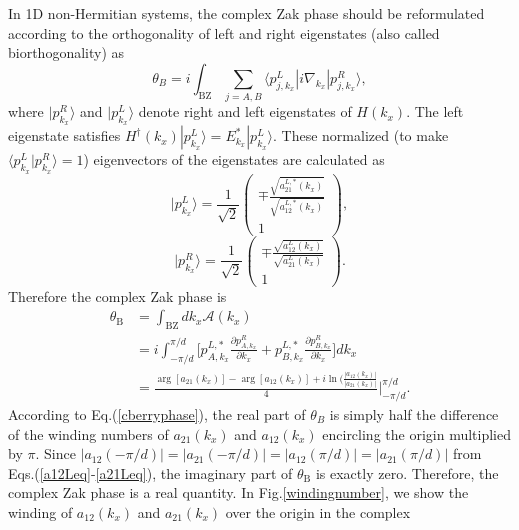 \documentclass[aps,pra,reprint,groupedaddress,nofootinbib,longbibliography,showpacs]{revtex4-1}
\begin{document}
In 1D non-Hermitian systems, the complex Zak phase should be reformulated according to the orthogonality of left and right eigenstates (also called biorthogonality) \cite{esakiPRB2011,schomerusOL2013,lingSR2016,weimannNaturemat2017,dingPRB2015,jinPRA2017,lieuPRB2018,shenPRL2018,partoPRL2018,yucePLA2015,wagnerAP2017,yucePRA2018,lieuPRB2018,alvarezPRB2018} as 
\begin{equation}
\theta_B=i\int_\mathrm{BZ}\sum_{j=A,B}\langle p_{j,k_x}^{L}|i\nabla_{k_x}|p^R_{j,k_x}\rangle,
\end{equation}
where $|p_{k_x}^{R}\rangle$ and $|p_{k_x}^{L}\rangle$ denote right and left eigenstates of $H(k_x)$. The left eigenstate satisfies $H^\dag(k_x)|p_{k_x}^{L}\rangle=E_{k_x}^*|p_{k_x}^{L}\rangle$. These normalized (to make $\langle p_{k_x}^{L}|p_{k_x}^{R}\rangle=1$) eigenvectors of the eigenstates are calculated as
\begin{equation}
|p_{k_x}^{L}\rangle=\frac{1}{\sqrt{2}}\left(\begin{matrix}\mp\frac{\sqrt{a_{21}^{L,*}(k_x)}}{\sqrt{a_{12}^{L,*}(k_x)}}\\1\end{matrix}\right),
\end{equation}
\begin{equation}
|p_{k_x}^{R}\rangle=\frac{1}{\sqrt{2}}\left(\begin{matrix}\mp\frac{\sqrt{a_{12}^L(k_x)}}{\sqrt{a_{21}^L(k_x)}}\\1\end{matrix}\right).
\end{equation}
Therefore the complex Zak phase is
\begin{equation}\label{cberryphase}
\begin{split}
\theta_\mathrm{B}&=\int_\mathrm{BZ}dk_x\mathcal{A}(k_x)\\&=i\int_{-\pi/d}^{\pi/d}\Big[p_{A,k_x}^{L,*}\frac{\partial p_{A,k_x}^R}{\partial k_x}+p_{B,k_x}^{L,*}\frac{\partial p_{B,k_x}^R}{\partial k_x}\Big]dk_x\\&=\frac{\arg[a_{21}(k_x)]-\arg[a_{12}(k_x)]+i\ln(\frac{|a_{12}(k_x)|}{|a_{21}(k_x)|}}{4}\Big|_{-\pi/d}^{\pi/d}.
\end{split}
\end{equation}
According to Eq.(\ref{cberryphase}), the real part of $\theta_B$ is simply half the difference of the winding numbers of $a_{21}(k_x)$ and $a_{12}(k_x)$ encircling the origin multiplied by $\pi$. Since $|a_{12}(-\pi/d)|=|a_{21}(-\pi/d)|=|a_{12}(\pi/d)|=|a_{21}(\pi/d)|$ from Eqs.(\ref{a12Leq}-\ref{a21Leq}), the imaginary part of $\theta_\mathrm{B}$ is exactly zero. Therefore, the complex Zak phase is a real quantity. In Fig.\ref{windingnumber}, we show the winding of $a_{12}(k_x)$ and $a_{21}(k_x)$ over the origin in the complex
\end{document}
